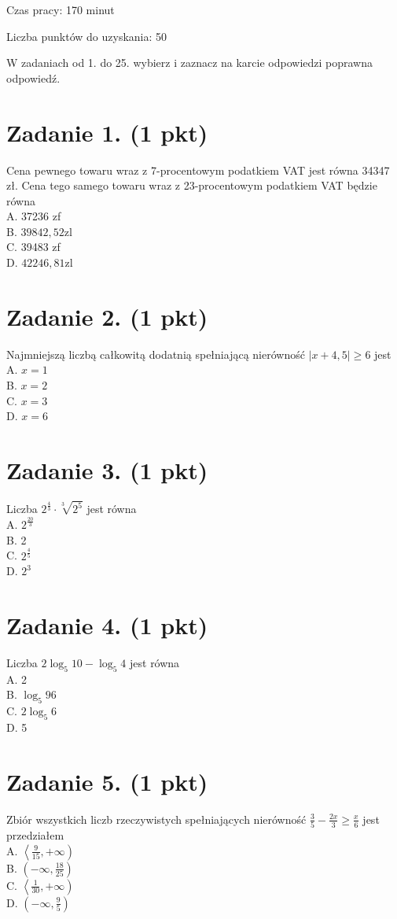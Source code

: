 \documentclass[10pt]{article}
\begin{document}
Czas pracy: 170 minut

Liczba punktów do uzyskania: 50

W zadaniach od 1. do 25. wybierz i zaznacz na karcie odpowiedzi poprawna odpowiedź.

\section*{Zadanie 1. (1 pkt)}
Cena pewnego towaru wraz z 7-procentowym podatkiem VAT jest równa 34347 zł. Cena tego samego towaru wraz z 23-procentowym podatkiem VAT będzie równa\\
A. 37236 zf\\
B. \(39842,52 \mathrm{zl}\)\\
C. 39483 zf\\
D. \(42246,81 \mathrm{zl}\)

\section*{Zadanie 2. (1 pkt)}
Najmniejszą liczbą całkowitą dodatnią spełniającą nierówność \(|x+4,5| \geq 6\) jest\\
A. \(x=1\)\\
B. \(x=2\)\\
C. \(x=3\)\\
D. \(x=6\)

\section*{Zadanie 3. (1 pkt)}
Liczba \(2^{\frac{4}{3}} \cdot \sqrt[3]{2^{5}}\) jest równa\\
A. \(2^{\frac{20}{3}}\)\\
B. 2\\
C. \(2^{\frac{4}{5}}\)\\
D. \(2^{3}\)

\section*{Zadanie 4. (1 pkt)}
Liczba \(2 \log _{5} 10-\log _{5} 4\) jest równa\\
A. 2\\
B. \(\log _{5} 96\)\\
C. \(2 \log _{5} 6\)\\
D. 5

\section*{Zadanie 5. (1 pkt)}
Zbiór wszystkich liczb rzeczywistych spełniających nierówność \(\frac{3}{5}-\frac{2 x}{3} \geq \frac{x}{6}\) jest przedziałem\\
A. \(\left\langle\frac{9}{15},+\infty\right)\)\\
B. \(\left(-\infty, \frac{18}{25}\right)\)\\
C. \(\left\langle\frac{1}{30},+\infty\right)\)\\
D. \(\left(-\infty, \frac{9}{5}\right)\)
\end{document}
